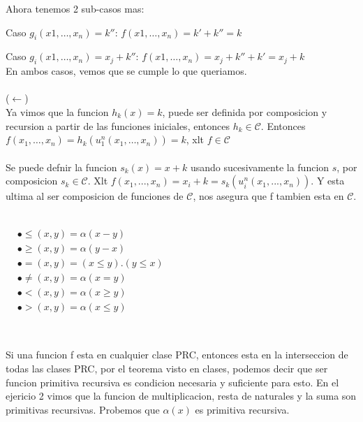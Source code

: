 \documentclass{report}
\begin{document}
Ahora tenemos 2 sub-casos mas:

Caso $g_i(x1, \ldots, x_n) = k''$:  $f(x1, \ldots, x_n) = k' + k'' = k$

Caso $g_i(x1, \ldots, x_n) = x_j + k''$: $f(x1, \ldots, x_n) = x_j + k'' + k' = x_j + k$
\\
En ambos casos, vemos que se cumple lo que queriamos.
\\\\

($\leftarrow$)\\
Ya vimos que la funcion $h_k(x) = k$, puede ser definida por composicion y recursion a partir de
las funciones iniciales, entonces $h_k \in \mathcal{C}$.
Entonces $f(x_1 , \ldots , x_n) = h_k(u_1^n(x_1 , \ldots , x_n)) = k$, xlt $f \in \mathcal{C}$
\\\\
Se puede defnir la funcion $s_k(x) = x + k$ usando sucesivamente la funcion $s$, por composicion $s_k \in \mathcal{C}$.
Xlt $f(x_1, ... , x_n) = x_i  + k = s_k(u_i^n(x_1, ... , x_n))$. Y esta ultima al ser composicion de funciones de
$\mathcal{C}$, nos asegura que f tambien esta en $\mathcal{C}$.


\sol \\

$\begin{aligned}&\bullet\leq(x,y)=\alpha(x-y)\\&\bullet\geq(x,y)=\alpha(y-x)\\&\bullet=(x,y)=(x\leq y).(y\leq x)\\&\bullet\neq(x,y)=\alpha(x=y)\\&\bullet<(x,y)=\alpha(x\geq y)\\&\bullet>(x,y)=\alpha(x\leq y)\end{aligned}$

~


Si una funcion f esta en cualquier clase PRC, entonces esta en la interseccion de todas las clases PRC, por el teorema visto en clases, podemos decir que 
ser funcion primitiva recursiva es condicion necesaria y suficiente para esto.
En el ejericio 2 vimos que la funcion de multiplicacion, resta de naturales y la suma son primitivas recursivas. Probemos que $\alpha(x)$ es primitiva recursiva.
\end{document}
